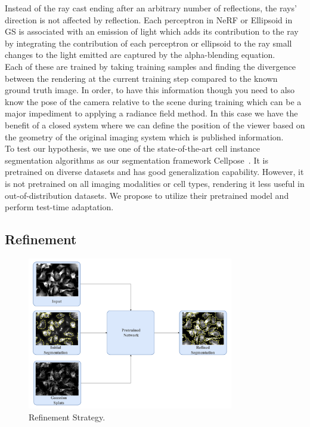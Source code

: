 Instead of the ray cast ending after an arbitrary number of reflections, the rays’ direction is not affected by reflection.  Each perceptron in NeRF or Ellipsoid in GS is associated with an emission of light which adds its contribution to the ray by integrating the contribution of each perceptron or ellipsoid to the ray small changes to the light emitted are captured by the alpha-blending equation.  \\

Each of these are trained by taking training samples and finding the divergence between the rendering at the current training step compared to the known ground truth image.  In order, to have this information though you need to also know the pose of the camera relative to the scene during training which can be a major impediment to applying a radiance field method. In this case we have the benefit of a closed system where we can define the position of the viewer based on the geometry of the original imaging system which is published information.  \\

To test our hypothesis, we use one of the state-of-the-art cell instance segmentation algorithms as our segmentation framework Cellpose~\cite{stringer2021cellpose}. It is pretrained on diverse datasets and has good generalization capability. However, it is not pretrained on all imaging modalities or cell types, rendering it less useful in out-of-distribution datasets. We propose to utilize their pretrained model and perform test-time adaptation. 

\subsection{Refinement}

\begin{figure}[t]
    \centering
    \includegraphics[width=9cm]{figs/refinement.pdf}
    \caption{Refinement Strategy.}
    \label{fig:refinement}
\end{figure}